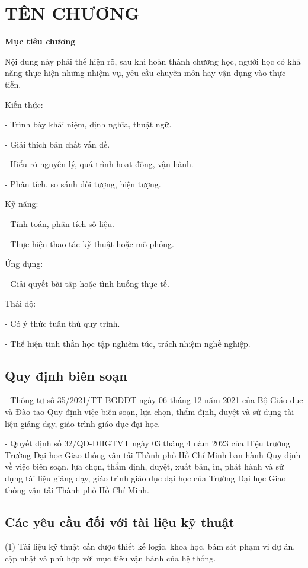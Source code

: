 \chapter{TÊN CHƯƠNG}

\noindent\textbf{Mục tiêu chương}

\noindent Nội dung này phải thể hiện rõ, sau khi hoàn thành chương học, người học có khả năng thực hiện những nhiệm vụ, yêu cầu chuyên môn hay vận dụng vào thực tiễn.

\noindent Kiến thức:

- Trình bày khái niệm, định nghĩa, thuật ngữ.

- Giải thích bản chất vấn đề.

- Hiểu rõ nguyên lý, quá trình hoạt động, vận hành.

- Phân tích, so sánh đối tượng, hiện tượng.

\noindent Kỹ năng: 

- Tính toán, phân tích số liệu.

- Thực hiện thao tác kỹ thuật hoặc mô phỏng.

\noindent Ứng dụng:

- Giải quyết bài tập hoặc tình huống thực tế.

\noindent Thái độ: 

- Có ý thức tuân thủ quy trình.

- Thể hiện tinh thần học tập nghiêm túc, trách nhiệm nghề nghiệp.

\section{Quy định biên soạn}
\hspace{0.5 cm}- Thông tư số 35/2021/TT-BGDĐT ngày 06 tháng 12 năm 2021 của Bộ Giáo dục và Đào tạo Quy định việc biên soạn, lựa chọn, thẩm định, duyệt và sử dụng tài liệu giảng dạy, giáo trình giáo dục đại học.

- Quyết định số 32/QĐ-ĐHGTVT ngày 03 tháng 4 năm 2023 của Hiệu trưởng Trường Đại học Giao thông vận tải Thành phố Hồ Chí Minh ban hành Quy định về việc biên soạn, lựa chọn, thẩm định, duyệt, xuất bản, in, phát hành và sử dụng tài liệu giảng dạy, giáo trình giáo dục đại học của Trường Đại học Giao thông vận tải Thành phố Hồ Chí Minh.

\section{Các yêu cầu đối với tài liệu kỹ thuật}
(1) Tài liệu kỹ thuật cần được thiết kế logic, khoa học, bám sát phạm vi dự án, cập nhật và phù hợp với mục tiêu vận hành của hệ thống.

